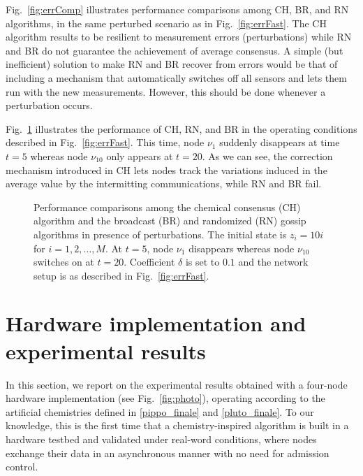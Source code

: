 \documentclass[journal]{IEEEtran}
\begin{document}
{Fig.~\ref{fig:errComp} illustrates performance comparisons among CH, BR, and RN algorithms, in the same perturbed scenario as in Fig.~\ref{fig:errFast}. The CH algorithm results to be resilient to measurement errors (perturbations) while RN and BR do not guarantee the achievement of average consensus. A simple (but inefficient) solution to make RN and BR recover from errors would be that of including a mechanism that automatically switches off all sensors and lets them run with the new measurements. However, this should be done whenever a perturbation occurs.}




{Fig.~\ref{fig:onoffComp} illustrates the performance of CH, RN, and BR in the operating conditions described in Fig.~\ref{fig:errFast}. This time, node $\nu_1$ suddenly disappears at time $t=5$ whereas node $\nu_{10}$ only appears at $t=20$. As we can see, the correction mechanism introduced in CH lets nodes track the variations induced in the average value by the intermitting communications, while RN and BR fail.
} 





\begin{figure}[t]
 \centering
\caption{{Performance comparisons among the chemical consensus (CH) algorithm and the broadcast (BR) and randomized (RN) gossip algorithms in presence of perturbations. The initial state is $z_i=10i$ for $i=1,2,\ldots,M$. At $t=5$, node $\nu_1$ disappears whereas node $\nu_{10}$ switches on at $t=20$. Coefficient $\delta$ is set to $0.1$ and the network setup is as described in Fig.~\ref{fig:errFast}.}}
\label{fig:onoffComp}
\end{figure}










\section{Hardware implementation and experimental results}\label{sec:HWimpl}
{In this section, we report on the experimental results obtained with a four-node hardware implementation (see Fig.~\ref{fig:photo}), operating according to the artificial chemistries defined in \eqref{pippo_finale} and \eqref{pluto_finale}. To our knowledge, this is the first time that a chemistry-inspired algorithm is built in a hardware testbed and validated under real-word conditions, where nodes exchange their data in an asynchronous manner with no need for admission control. }
\end{document}
